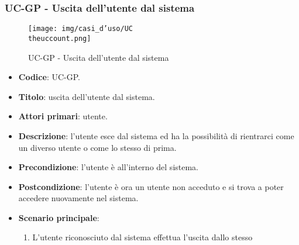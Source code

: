 \subsubsection{UC\theuccount-GP - Uscita dell'utente dal sistema}
		\begin{figure}[H]
			\centering
				\texttt{[image: img/casi\_d'uso/UC\\theuccount.png]}\\
			\caption{UC\theuccount-GP - Uscita dell'utente dal sistema}
		\end{figure}
	\begin{itemize}
		\item \textbf{Codice}: UC\theuccount-GP.
		\item \textbf{Titolo}: uscita dell'utente dal sistema.
		\item \textbf{Attori primari}: utente.
		\item \textbf{Descrizione}: l'utente esce dal sistema ed ha la possibilità di rientrarci come	un diverso utente o come lo stesso di prima.
		\item \textbf{Precondizione}: l'utente è all'interno del sistema.
		\item \textbf{Postcondizione}: l'utente è ora un utente non acceduto e si trova a poter accedere nuovamente nel sistema.
		\item \textbf{Scenario principale}:
		\begin{enumerate}
			\item L'utente riconosciuto dal sistema effettua l'uscita dallo stesso
		\end{enumerate}
	\end{itemize}
